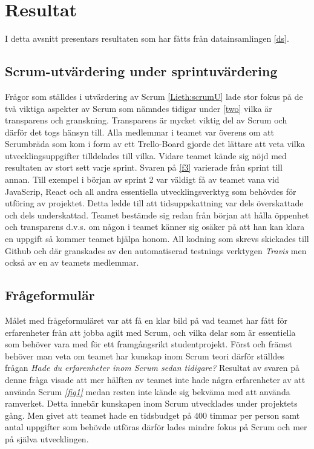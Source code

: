 \section{Resultat}
\label{sec:Lieth_Wahid-results}
I detta avsnitt presentars resultaten som har fåtts från datainsamlingen \ref{ds}.
\subsection{Scrum-utvärdering under sprintuvärdering}
Frågor som ställdes i utvärdering av Scrum \ref{Lieth:scrumU} lade stor fokus på de två viktiga aspekter av Scrum som nämndes tidigar under \ref{two} vilka är transparens och granskning.
Transparens är mycket viktig del av Scrum och därför det togs hänsyn till. Alla medlemmar i teamet var överens om att Scrumbräda som kom i form av ett Trello-Board gjorde det lättare att veta vilka 
utvecklingsuppgifter tilldelades till vilka. Vidare teamet kände sig nöjd med resultaten av stort sett varje sprint. Svaren på \ref{f3} varierade från sprint till annan. Till exempel i början av sprint 2 var väldigt få av teamet  
vana vid JavaScrip, React och all andra essentiella utvecklingsverktyg som behövdes för utföring av projektet. Detta ledde till att tidsuppskattning var dels överskattade och dels underskattad. Teamet bestämde sig redan från
början att hålla öppenhet och transparens d.v.s. om någon i teamet känner sig osäker på att han kan klara en uppgift så kommer teamet hjälpa honom. All kodning som skrevs skickades till Github och där granskades av den automatiserad testnings verktygen \textit{Travis} men också av en av teamets medlemmar.

\subsection{Frågeformulär}
Målet med frågeformuläret var att få en klar bild på vad teamet har fått för erfarenheter från att jobba agilt med Scrum, och vilka delar som är essentiella som behöver vara med för ett framgångsrikt studentprojekt. Först och främst behöver man veta om teamet har kunskap inom Scrum teori därför ställdes frågan \textit{Hade du erfarenheter inom Scrum sedan tidigare? }Resultat av svaren på denne fråga visade att mer hälften av teamet inte hade några erfarenheter av att använda Scrum \textit{ \ref{fig1} } medan resten inte kände sig bekväma med att använda ramverket. Detta innebär kunskapen inom Scrum utvecklades under projektets gång. Men givet att teamet hade en tidsbudget på 400 timmar per person samt antal uppgifter som behövde utföras därför lades mindre fokus på Scrum och mer på själva utvecklingen.  

